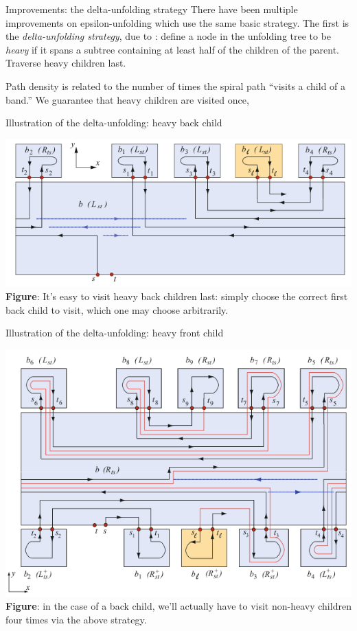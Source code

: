 \documentclass{beamer}
\theoremstyle{plain}
\begin{document}
  \begin{frame}{Improvements: the delta-unfolding strategy}
    There have been multiple improvements on epsilon-unfolding which use the same basic strategy.
    The first is the \emph{delta-unfolding strategy}, due to :
    define a node in the unfolding tree to be \emph{heavy} if it spans a subtree containing at least half of the children of the parent.
    Traverse heavy children last.
    
    \pause Path density is related to the number of times the spiral path ``visits a child of a band.''
    We guarantee that heavy children are visited once,
  \end{frame}

\begin{frame}{Illustration of the delta-unfolding: heavy back child}
  \begin{center}
    \includegraphics[width=\textwidth]{./figs/Delta_unfolding_back.png}\\
    \tiny \textbf{Figure}: It's easy to visit heavy back children last: simply choose the correct first back child to visit, which one may choose arbitrarily.
  \end{center}
\end{frame}

\begin{frame}{Illustration of the delta-unfolding: heavy front child}
  \begin{center}
    \includegraphics[width=.75\textwidth]{./figs/Delta_unfolding_front.png}\\
    \tiny \textbf{Figure}: in the case of a back child, we'll actually have to visit non-heavy children four times via the above strategy.
  \end{center}
\end{frame}
\end{document}
